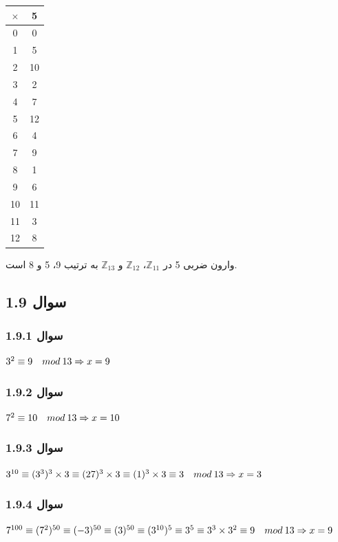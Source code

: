\documentclass{article}
\begin{document}
\begin{latin}
\begin{table}[H]
\centering
\begin{tabular}{|c|c|}
\hline
$\times$ & 5  \\ \hline
0        & 0  \\ \hline
1        & 5  \\ \hline
2        & 10 \\ \hline
3        & 2  \\ \hline
4        & 7  \\ \hline
5        & 12 \\ \hline
6        & 4  \\ \hline
7        & 9  \\ \hline
8        & 1  \\ \hline
9        & 6  \\ \hline
10       & 11 \\ \hline
11       & 3  \\ \hline
12       & 8  \\ \hline
\end{tabular}
\end{table}
\end{latin}
وارون ضربی 5 در  $\mathbb{Z}_{11}$،  $\mathbb{Z}_{12}$ و  $\mathbb{Z}_{13}$ به ترتیب 9، 5 و 8 است.

\subsection{سوال 1.9}
\subsubsection{سوال 1.9.1}
$3 ^ 2 \equiv 9 \quad mod\:13 \Rightarrow x = 9 \\$

\subsubsection{سوال 1.9.2}
$7 ^ 2 \equiv 10 \quad mod\:13 \Rightarrow x = 10 \\$

\subsubsection{سوال 1.9.3}
$3 ^ {10} \equiv (3 ^ {3}) ^ 3 \times 3 \equiv (27) ^ 3 \times 3 \equiv (1) ^ 3 \times 3 \equiv 3 \quad mod\:13 \Rightarrow x = 3 \\$

\subsubsection{سوال 1.9.4}
$7 ^ {100} \equiv (7 ^ {2}) ^ {50} \equiv (-3) ^ {50} \equiv (3) ^ {50} \equiv (3 ^ {10}) ^ 5 \equiv 3 ^ 5 \equiv  3 ^ 3 \times 3 ^ 2 \equiv 9 \quad mod\:13 \Rightarrow x = 9 \\$
\end{document}
